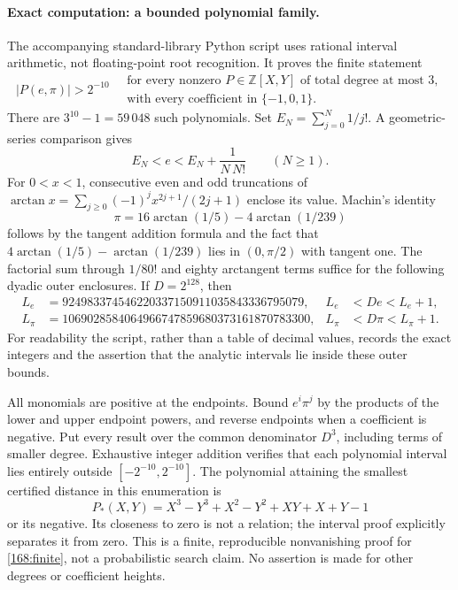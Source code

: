 \documentclass[11pt,a4paper]{article}
\newcommand{\Z}{\mathbb{Z}}
\numberwithin{equation}{section}
\begin{document}
\paragraph{Exact computation: a bounded polynomial family.}
The accompanying standard-library Python script uses rational interval
arithmetic, not floating-point root recognition. It proves the finite
statement
\begin{equation}\label{168:finite}
 \left|P(e,\pi)\right|>2^{-10}
 \quad\begin{gathered}
  \text{for every nonzero }P\in\Z[X,Y]\text{ of total degree at most }3,\\
  \text{with every coefficient in }\{-1,0,1\}.
 \end{gathered}
\end{equation}
There are $3^{10}-1=59\,048$ such polynomials. Set
$E_N=\sum_{j=0}^N1/j!$. A geometric-series comparison gives
\begin{equation}
 E_N<e<E_N+\frac1{N\,N!}\qquad(N\geq1).
\end{equation}
For $0<x<1$, consecutive even and odd truncations of
$\arctan x=\sum_{j\geq0}(-1)^j x^{2j+1}/(2j+1)$ enclose its value.
Machin's identity
\begin{equation}
 \pi=16\arctan(1/5)-4\arctan(1/239)
\end{equation}
follows by the tangent addition formula and the fact that
$4\arctan(1/5)-\arctan(1/239)$ lies in $(0,\pi/2)$ with tangent one.
The factorial sum through $1/80!$ and eighty arctangent terms suffice for the
following dyadic outer enclosures. If $D=2^{128}$, then
\begin{align*}
 L_e&=924983374546220337150911035843336795079,
 & L_e&<De<L_e+1,\\
 L_\pi&=1069028584064966747859680373161870783300,
 & L_\pi&<D\pi<L_\pi+1.
\end{align*}
For readability the script, rather than a table of decimal values,
records the exact integers and the assertion that the analytic
intervals lie inside these outer bounds.

All monomials are positive at the endpoints. Bound $e^i\pi^j$ by the
products of the lower and upper endpoint powers, and reverse endpoints
when a coefficient is negative. Put every result over the common
denominator $D^3$, including terms of smaller degree. Exhaustive
integer addition verifies that each polynomial interval lies entirely
outside $[-2^{-10},2^{-10}]$. The polynomial attaining the smallest
certified distance in this enumeration is
\begin{equation}
 P_*(X,Y)=X^3-Y^3+X^2-Y^2+XY+X+Y-1
\end{equation}
or its negative. Its closeness to zero is not a relation; the interval
proof explicitly separates it from zero. This is a finite, reproducible
nonvanishing proof for \eqref{168:finite}, not a probabilistic search
claim. No assertion is made for other degrees or coefficient heights.
\end{document}
